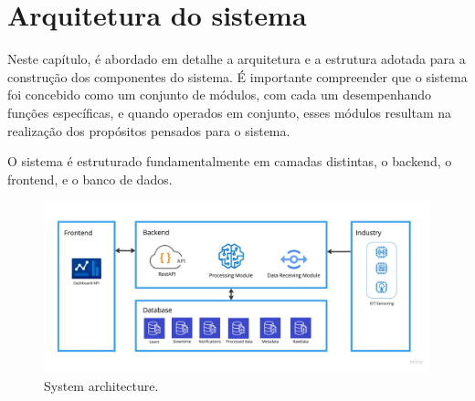 


\chapter{Arquitetura do sistema}\label{cap:development}
Neste capítulo, é abordado em detalhe a arquitetura e a estrutura adotada para a construção dos componentes do sistema. É importante compreender que o sistema foi concebido como um conjunto de módulos, com cada um desempenhando funções específicas, e quando operados em conjunto, esses módulos resultam na realização dos propósitos pensados para o sistema.

O sistema é estruturado fundamentalmente em camadas distintas, o backend, o frontend, e o banco de dados.

\begin{figure}[htbp]
	\centering
	\includegraphics[width=\textwidth]{images/Architecture.jpg}
	\caption{System architecture.}
	\label{fig:systemAchitectureImage}
\end{figure}

